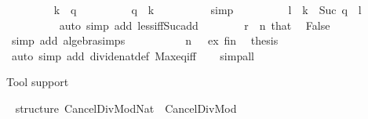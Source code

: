 \begin{isabellebody}
\ \ \ \ \ \ \isamarkupfalse%
\ {\isachardoublequoteopen}{\isasymnot}\ k\ {\isasymle}\ q{\isachardoublequoteclose}\isanewline
\ \ \ \ \ \ \isamarkupfalse%
\ \isamarkupfalse%
\ {\isachardoublequoteopen}q\ {\isacharless}{\kern0pt}\ k{\isachardoublequoteclose}\isanewline
\ \ \ \ \ \ \ \ \isamarkupfalse%
\ simp\isanewline
\ \ \ \ \ \ \isamarkupfalse%
\ \isamarkupfalse%
\ l\ \ {\isachardoublequoteopen}k\ {\isacharequal}{\kern0pt}\ Suc\ {\isacharparenleft}{\kern0pt}q\ {\isacharplus}{\kern0pt}\ l{\isacharparenright}{\kern0pt}{\isachardoublequoteclose}\isanewline
\ \ \ \ \ \ \ \ \isamarkupfalse%
\ {\isacharparenleft}{\kern0pt}auto\ simp\ add{\isacharcolon}{\kern0pt}\ less{\isacharunderscore}{\kern0pt}iff{\isacharunderscore}{\kern0pt}Suc{\isacharunderscore}{\kern0pt}add{\isacharparenright}{\kern0pt}\isanewline
\ \ \ \ \ \ \isamarkupfalse%
\ {\isacartoucheopen}r\ {\isacharless}{\kern0pt}\ n{\isacartoucheclose}\ that\ \isamarkupfalse%
\ False\isanewline
\ \ \ \ \ \ \ \ \isamarkupfalse%
\ {\isacharparenleft}{\kern0pt}simp\ add{\isacharcolon}{\kern0pt}\ algebra{\isacharunderscore}{\kern0pt}simps{\isacharparenright}{\kern0pt}\isanewline
\ \ \ \ \isamarkupfalse%
\isanewline
\ \ \ \ \isamarkupfalse%
\ {\isacartoucheopen}n\ {\isasymnoteq}\ {}{\isacartoucheclose}\ ex\ fin\ \isamarkupfalse%
\ {\isacharquery}{\kern0pt}thesis\isanewline
\ \ \ \ \ \ \isamarkupfalse%
\ {\isacharparenleft}{\kern0pt}auto\ simp\ add{\isacharcolon}{\kern0pt}\ divide{\isacharunderscore}{\kern0pt}nat{\isacharunderscore}{\kern0pt}def\ Max{\isacharunderscore}{\kern0pt}eq{\isacharunderscore}{\kern0pt}iff{\isacharparenright}{\kern0pt}\isanewline
\ \ \isamarkupfalse%
\isanewline
{}\isamarkupfalse%
\ simp{\isacharunderscore}{\kern0pt}all%
\endisatagproof
{\isafoldproof}%
%
\isadelimproof
%
\endisadelimproof
\isanewline
\isanewline
{}\isamarkupfalse%
%
\begin{isamarkuptext}%
Tool support%
\end{isamarkuptext}\isamarkuptrue%
%
\isadelimML
%
\endisadelimML
%
\isatagML
{}\isamarkupfalse%
\ {\isacartoucheopen}\isanewline
structure\ Cancel{\isacharunderscore}{\kern0pt}Div{\isacharunderscore}{\kern0pt}Mod{\isacharunderscore}{\kern0pt}Nat\ {\isacharequal}{\kern0pt}\ Cancel{\isacharunderscore}{\kern0pt}Div{\isacharunderscore}{\kern0pt}Mod\isanewline

\end{isabellebody}
